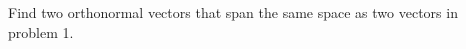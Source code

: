 \begin{question}{2} %
Find two orthonormal vectors that span the same space as two vectors in problem 1.
\end{question}
